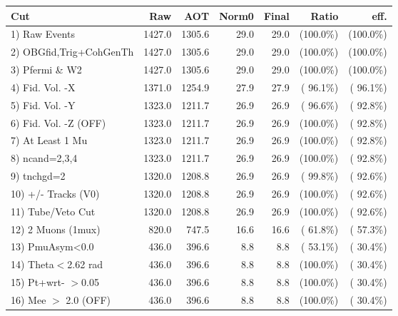  \begin{table}[h!]\centering
 \begin{tabular}{||l||r|r|r|r|r|r||}
 \hline
 \hline
 Cut & Raw & AOT & Norm0 & Final & Ratio & eff.       \\
 \hline
  1) Raw Events           &       1427.0 &       1305.6 &         29.0 &         29.0 & (100.0\%) & (100.0\%) \\
  2) OBGfid,Trig+CohGenTh &       1427.0 &       1305.6 &         29.0 &         29.0 & (100.0\%) & (100.0\%) \\
  3) Pfermi \& W2         &       1427.0 &       1305.6 &         29.0 &         29.0 & (100.0\%) & (100.0\%) \\
  4) Fid. Vol. -X         &       1371.0 &       1254.9 &         27.9 &         27.9 & ( 96.1\%) & ( 96.1\%) \\
  5) Fid. Vol. -Y         &       1323.0 &       1211.7 &         26.9 &         26.9 & ( 96.6\%) & ( 92.8\%) \\
  6) Fid. Vol. -Z (OFF)   &       1323.0 &       1211.7 &         26.9 &         26.9 & (100.0\%) & ( 92.8\%) \\
  7) At Least 1 Mu        &       1323.0 &       1211.7 &         26.9 &         26.9 & (100.0\%) & ( 92.8\%) \\
  8) ncand=2,3,4          &       1323.0 &       1211.7 &         26.9 &         26.9 & (100.0\%) & ( 92.8\%) \\
  9) tnchgd=2             &       1320.0 &       1208.8 &         26.9 &         26.9 & ( 99.8\%) & ( 92.6\%) \\
 10) +/- Tracks (V0)      &       1320.0 &       1208.8 &         26.9 &         26.9 & (100.0\%) & ( 92.6\%) \\
 11) Tube/Veto Cut        &       1320.0 &       1208.8 &         26.9 &         26.9 & (100.0\%) & ( 92.6\%) \\
 12) 2 Muons (1mux)       &        820.0 &        747.5 &         16.6 &         16.6 & ( 61.8\%) & ( 57.3\%) \\
 13) PmuAsym<0.0          &        436.0 &        396.6 &          8.8 &          8.8 & ( 53.1\%) & ( 30.4\%) \\
 14) Theta$<$2.62 rad     &        436.0 &        396.6 &          8.8 &          8.8 & (100.0\%) & ( 30.4\%) \\
 15) Pt+wrt- $>$0.05      &        436.0 &        396.6 &          8.8 &          8.8 & (100.0\%) & ( 30.4\%) \\
 16) Mee $>$ 2.0  (OFF)   &        436.0 &        396.6 &          8.8 &          8.8 & (100.0\%) & ( 30.4\%) \\

\end{tabular}
\end{table}
